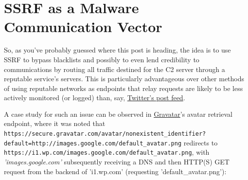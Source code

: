 \section{SSRF as a Malware Communication Vector}

So, as you've probably guessed where this post is heading, the idea is to use SSRF to bypass blacklists and possibly to even
            lend credibility to communications by routing all traffic destined for the C2 server through a reputable service's servers.
            This is particularly advantageous over other methods of using reputable networks as endpoints that relay requests are likely
            to be less actively monitored (or logged) than, say, \href{https://zeltser.com/bots-command-and-control-via-social-media/}{Twitter's post feed}.

A case study for such an issue can be observed in \href{https://en.gravatar.com/}{Gravatar}'s avatar retrieval endpoint, where it was noted that
            \texttt{https://secure.gravatar.com/avatar/nonexistent\_identifier?
            default=http://images.google.com/default\_avatar.png} redirects to
            \texttt{https://i1.wp.com/images.google.com/default\_avatar.png},
            with \textit{'images.google.com'} subsequently receiving a DNS and then HTTP(S) GET request from the backend of 'i1.wp.com'
            (requesting 'default\_avatar.png'):

